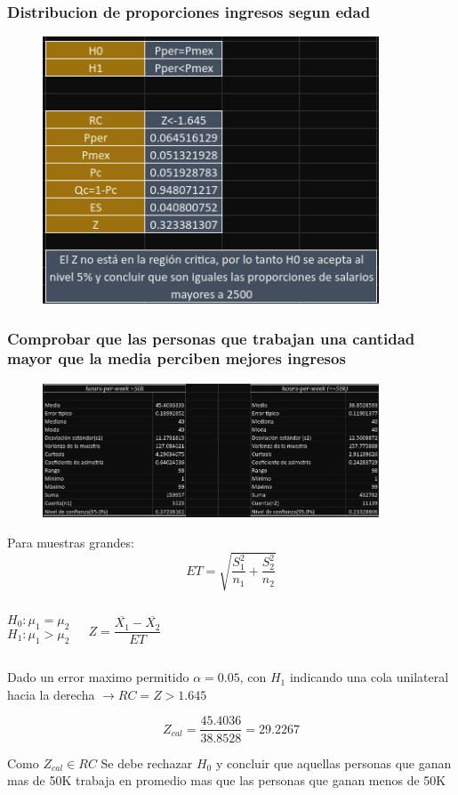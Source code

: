 \documentclass{beamer}
\begin{document}
\begin{frame}
  \frametitle{Distribucion de proporciones ingresos segun edad}
\begin{figure}[t]
    \includegraphics[width=10cm]{cuyate2.png}
\end{figure}
\end{frame}

\begin{frame}
  \frametitle{Comprobar que las personas que trabajan una cantidad
  mayor que la media perciben mejores ingresos
  }
  \begin{figure}[t]
      \includegraphics[width=10cm]{alvares1.png}
  \end{figure}
\end{frame}

\begin{frame}
  Para muestras grandes: \[ET = \sqrt{\frac{S_1 ^ 2}{n_1} + \frac{S_2 ^ 2}{n_2}}\]

  \begin{columns}
   \[H_0: \mu_1 = \mu_2\]
   \[H_1: \mu_1 > \mu_2\]


      \[\textit{Z} = \frac{\overline{X_1} - \overline{X_2}}{ET}\]
      \newline

  \end{columns}

  Dado un error maximo permitido $\alpha = 0.05$, con \textit{$H_1$} indicando una cola unilateral
  hacia la derecha $\rightarrow RC = {Z > 1.645}$

  \[Z_{cal} = \frac{45.4036}{38.8528} = 29.2267\]

  Como \textit{$Z_{cal} \in RC$} Se debe rechazar \textit{$H_0$} y concluir que
  aquellas personas que ganan mas de 50K trabaja en promedio mas que las personas
  que ganan menos de 50K

\end{frame}
\end{document}

